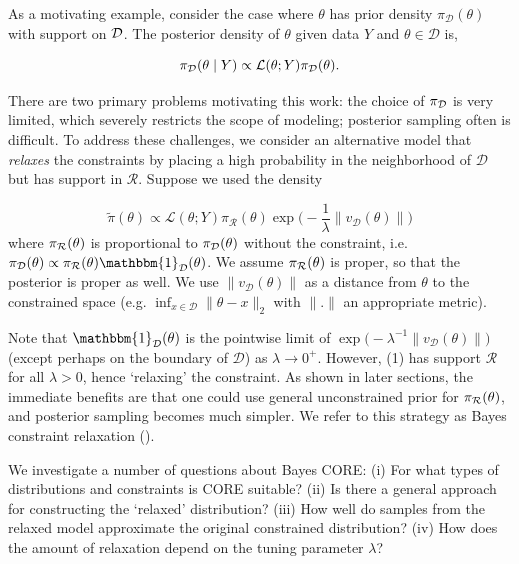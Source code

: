 \documentclass[10pt,fleqn]{article} \pdfoutput=1
\DeclareMathOperator{\1}{\mathbbm{1}} \DeclareMathOperator{\bigO}{\mc O}
\begin{document}
As a motivating example, consider the case where $\theta$ has prior density
$\pi_\mathcal{D}(\theta)$ with support on $\mathcal{D}$. The posterior density of $\theta$
given data $Y$ and $\theta \in \mathcal{D}$ is,

\begin{equation*}
\pi_{\mathcal{D}}(\theta \mid  Y) \propto \mathcal{L}(\theta; Y)
\pi_\mathcal{D}(\theta) .
\end{equation*}

There are two primary problems motivating this work: the choice of
$\pi_{\mathcal{D}}$ is very limited, which severely restricts the scope of modeling; posterior sampling often is difficult. To address these challenges, we consider an
alternative model that {\em relaxes} the constraints by placing a high
probability in the neighborhood of $\mathcal{D}$ but has support in $\mathcal{R}$. Suppose we used the density

\begin{equation}
\label{EQ:Rel_Dens_Motivation}
\tilde{\pi}(\theta) \propto
\mathcal{L}(\theta; Y)  \pi_\mathcal{R}(\theta)
\exp\bigg(-\frac{1}{\lambda} \|v_\mathcal{D}(\theta)\|\bigg)
\end{equation}
where  $\pi_{\mathcal{R}}(\theta)$ is proportional to $\pi_{\mathcal{D}}(\theta)$ without
the constraint, i.e. $\pi_\mathcal{D}(\theta) \propto \pi_\mathcal{R}(\theta)
\mathbbm{1}_{\mc D}(\theta)$. We assume $\pi_{\mathcal{R}}(\theta)$ is proper, so
that the posterior is proper as well. We use $\|v_\mathcal{D}(\theta)\|$ as
a distance from $\theta$ to the constrained space (e.g. $\inf_{x\in\mathcal{D}}
\|\theta-x\|_2$ with $\|.\|$ an appropriate metric).

Note that $\mathbbm{1}_\mathcal{D}(\theta)$ is the pointwise limit of
$\exp\big(- \lambda^{-1}\|v_\mathcal{D}(\theta)\|)$ (except perhaps on the
boundary of $\mathcal{D}$) as $\lambda \to 0^+.$ However, (1) has
support $\mathcal{R}$ for all $\lambda > 0$, hence `relaxing' the
constraint. As shown in later sections, the immediate benefits are that one
could use general unconstrained prior for $\pi_{\mathcal{R}}(\theta)$, and posterior sampling becomes much simpler.
We refer to this strategy as Bayes constraint relaxation (\core).

We investigate a number of questions about Bayes CORE:  (i) For
what types of distributions and constraints is CORE suitable? (ii) Is there
a general approach for constructing the `relaxed' distribution? (iii) How
well do samples from the relaxed model approximate the
original constrained distribution?  (iv) How does the amount of relaxation depend on the tuning parameter $\lambda$?
\end{document}
